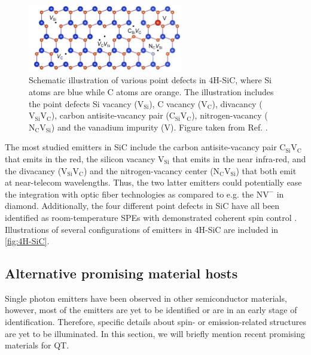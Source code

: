 \begin{figure}
  \centering
  \includegraphics[width=0.6\textwidth]{theory/figures/4H-SiC.png}
  \caption{Schematic illustration of various point defects in 4H-SiC, where Si atoms are blue while C atoms are orange. The illustration includes the point defects Si vacancy ($\text{V}_{\text{Si}}$), C vacancy ($\text{V}_{\text{C}}$), divacancy ($\text{V}_{\text{Si}}\text{V}_{\text{C}}$), carbon antisite-vacancy pair ($\text{C}_{\text{Si}}\text{V}_{\text{C}}$), nitrogen-vacancy ($\text{N}_{\text{C}}\text{V}_{\text{Si}}$) and the vanadium impurity ($\text{V}$). Figure taken from Ref. \cite{Bathen2020}.}
  \label{fig:4H-SiC}
\end{figure}

The most studied emitters in SiC include the carbon antisite-vacancy pair $\text{C}_{\text{Si}}\text{V}_{\text{C}}$ that emits in the red, the silicon vacancy $\text{V}_{\text{Si}}$ that emits in the near infra-red, and the divacancy ($\text{V}_{\text{Si}}\text{V}_{\text{C}}$) and the nitrogen-vacancy center ($\text{N}_{\text{C}}\text{V}_{\text{Si}}$) that both emit at near-telecom wavelengths.
Thus, the two latter emitters could potentially ease the integration with optic fiber technologies as compared to e.g. the $\text{NV}^{-}$ in diamond. Additionally, the four different point defects in SiC have all been identified as room-temperature SPEs with demonstrated coherent spin control \cite{Widmann2014, Kraus2013, Castelletto2013, Koehl2011, Bathen2019}. Illustrations of several configurations of emitters in 4H-SiC are included in \autoref{fig:4H-SiC}.

\subsection{Alternative promising material hosts}
\label{promising-material-hosts}

Single photon emitters have been observed in other semiconductor materials, however, most of the emitters are yet to be identified or are in an early stage of identification. Therefore, specific details about spin- or emission-related structures are yet to be illuminated. In this section, we will briefly mention recent promising materials for QT.

